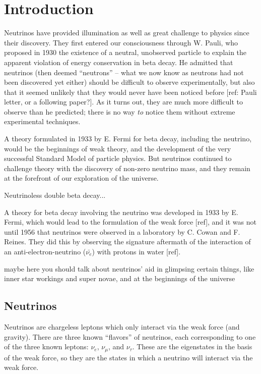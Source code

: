 \chapter{Introduction}

Neutrinos have provided illumination as well as great challenge to physics since their discovery.  They first entered our consciousness through W. Pauli, who proposed in 1930 the existence of a neutral, unobserved particle to explain the apparent violation of energy conservation in beta decay. He admitted that neutrinos (then deemed ``neutrons'' -- what we now know as neutrons had not been discovered yet either) should be difficult to observe experimentally, but also that it seemed unlikely that they would never have been noticed before [ref: Pauli letter, or a following paper?].  As it turns out, they are much more difficult to observe than he predicted; there is no way \emph{to} notice them without extreme experimental techniques.

A theory formulated in 1933 by E. Fermi for beta decay, including the neutrino, would be the beginnings of weak theory, and the development of the very successful Standard Model of particle physics.  But neutrinos continued to challenge theory with the discovery of non-zero neutrino mass, and they remain at the forefront of our exploration of the universe.

Neutrinoless double beta decay...

{\color{gray}A theory for beta decay involving the neutrino was developed in 1933 by E. Fermi, which would lead to the formulation of the weak force [ref], and it was not until 1956 that neutrinos were observed in a laboratory by C. Cowan and F. Reines.  They did this by observing the signature aftermath of the interaction of an anti-electron-neutrino ($\bar{\nu_{e}}$) with protons in water [ref].}

{\color{gray}maybe here you should talk about neutrinos' aid in glimpsing certain things, like inner star workings and super novae, and at the beginnings of the universe}

\section{Neutrinos}

Neutrinos are chargeless leptons which only interact via the weak force (and gravity).  There are three known ``flavors'' of neutrinos, each corresponding to one of the three known leptons:  $\nu_{e}$, $\nu_{\mu}$, and $\nu_{\tau}$.  These are the eigenstates in the basis of the weak force, so they are the states in which a neutrino will interact via the weak force.

